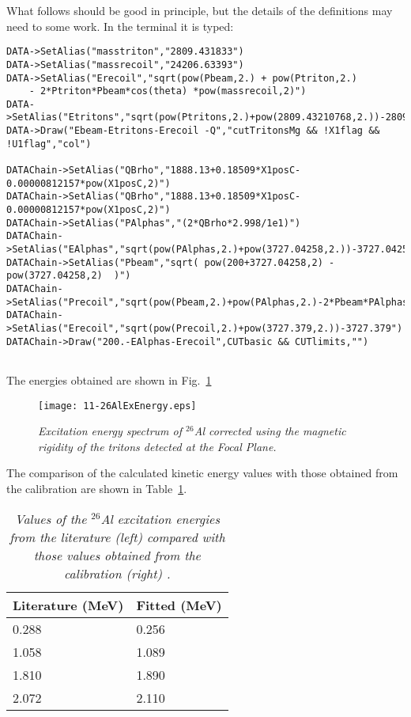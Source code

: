 \documentclass[11pt]{report}
\begin{document}
\noindent
{\color{red} What follows should be good in principle, but the details of the definitions may need to some work.}
In the terminal it is typed:
\begin{verbatim}
DATA->SetAlias("masstriton","2809.431833")
DATA->SetAlias("massrecoil","24206.63393")
DATA->SetAlias("Erecoil","sqrt(pow(Pbeam,2.) + pow(Ptriton,2.) 
	- 2*Ptriton*Pbeam*cos(theta) *pow(massrecoil,2)")
DATA->SetAlias("Etritons","sqrt(pow(Ptritons,2.)+pow(2809.43210768,2.))-2809.43210768")
DATA->Draw("Ebeam-Etritons-Erecoil -Q","cutTritonsMg && !X1flag && !U1flag","col")

DATAChain->SetAlias("QBrho","1888.13+0.18509*X1posC-0.00000812157*pow(X1posC,2)")
DATAChain->SetAlias("QBrho","1888.13+0.18509*X1posC-0.00000812157*pow(X1posC,2)")
DATAChain->SetAlias("PAlphas","(2*QBrho*2.998/1e1)")
DATAChain->SetAlias("EAlphas","sqrt(pow(PAlphas,2.)+pow(3727.04258,2.))-3727.04258")
DATAChain->SetAlias("Pbeam","sqrt( pow(200+3727.04258,2) -pow(3727.04258,2)  )")
DATAChain->SetAlias("Precoil","sqrt(pow(Pbeam,2.)+pow(PAlphas,2.)-2*Pbeam*PAlphas*cos(thetaSCAT*3.1415/180.))")
DATAChain->SetAlias("Erecoil","sqrt(pow(Precoil,2.)+pow(3727.379,2.))-3727.379")
DATAChain->Draw("200.-EAlphas-Erecoil",CUTbasic && CUTlimits,"")


\end{verbatim}

\noindent
The energies obtained are shown in Fig.~\ref{fig:26AlExEnergy}

\begin{figure}[h]
 \begin{center}
\texttt{[image: 11-26AlExEnergy.eps]}  
 \end{center}
\vspace*{-4mm}
\caption{\label{fig:26AlExEnergy} \it Excitation energy spectrum of $^{26}$Al corrected using the magnetic rigidity of the tritons detected at the Focal Plane.}
\end{figure}
\vspace*{4mm}

\noindent
The comparison of the calculated kinetic energy values with those obtained from the calibration are shown in Table~\ref{tab:Ttvalues}.

\begin{table}[!th]
\centering
\begin{tabular}{|l|l|}
\hline
Literature (MeV)&Fitted (MeV)\\
\hline
0.288&0.256\\
1.058&1.089\\
1.810&1.890\\
2.072&2.110\\
\hline
\end{tabular}
\caption{\it Values of the $^{26}$Al excitation energies from the literature (left) compared with those values obtained from the calibration (right) \cite{nndc}.}
\label{tab:Ttvalues}
\end{table}
\end{document}
